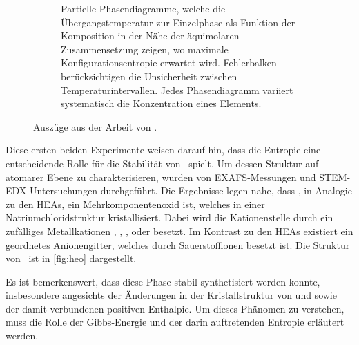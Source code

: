 \begin{figure}
\begin{subfigure}{0.6\textwidth}
        \caption{Partielle Phasendiagramme, welche die Übergangstemperatur zur Einzelphase als Funktion der Komposition
        in der Nähe der äquimolaren Zusammensetzung zeigen, wo maximale Konfigurationsentropie erwartet wird.
        Fehlerbalken berücksichtigen die Unsicherheit zwischen Temperaturintervallen. Jedes Phasendiagramm variiert
        systematisch die Konzentration eines Elements.}
        \label{fig:rost2}
        \vspace*{10mm}
    \end{subfigure}
    \caption{Auszüge aus der Arbeit von  \autocite{Rost2015}.}
\end{figure}
\captionsetup{justification=centering}

Diese ersten beiden Experimente weisen darauf hin, dass die Entropie eine entscheidende Rolle für die Stabilität von
\heo\ spielt.
Um dessen Struktur auf atomarer Ebene zu charakterisieren, wurden von  EXAFS-Messungen
und STEM-EDX Untersuchungen durchgeführt.
Die Ergebnisse legen nahe, dass \heo, in Analogie zu den HEAs, ein Mehrkomponentenoxid ist, welches in einer
Natriumchloridstruktur kristallisiert.
Dabei wird die Kationenstelle durch ein zufälliges Metallkationen , , ,
 oder  besetzt.
Im Kontrast zu den HEAs existiert ein geordnetes Anionengitter, welches durch Sauerstoffionen besetzt ist.
Die Struktur von \heo\ ist in \cref{fig:heo} dargestellt.

Es ist bemerkenswert, dass diese Phase stabil synthetisiert werden konnte, insbesondere angesichts der Änderungen in der
Kristallstruktur von  und  sowie der damit verbundenen positiven Enthalpie.
Um dieses Phänomen zu verstehen, muss die Rolle der Gibbs-Energie und der darin auftretenden Entropie
erläutert werden.

